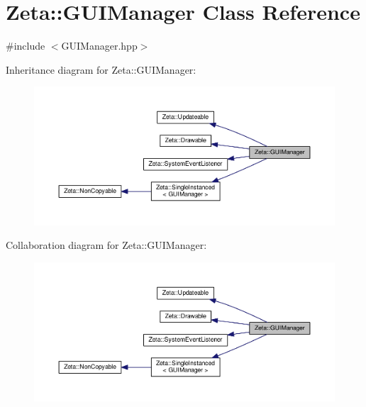 \hypertarget{classZeta_1_1GUIManager}{\section{Zeta\+:\+:G\+U\+I\+Manager Class Reference}
\label{classZeta_1_1GUIManager}
}


{\ttfamily \#include $<$G\+U\+I\+Manager.\+hpp$>$}



Inheritance diagram for Zeta\+:\+:G\+U\+I\+Manager\+:\nopagebreak
\begin{figure}[H]
\begin{center}
\leavevmode
\includegraphics[width=350pt]{classZeta_1_1GUIManager__inherit__graph}
\end{center}
\end{figure}


Collaboration diagram for Zeta\+:\+:G\+U\+I\+Manager\+:\nopagebreak
\begin{figure}[H]
\begin{center}
\leavevmode
\includegraphics[width=350pt]{classZeta_1_1GUIManager__coll__graph}
\end{center}
\end{figure}
